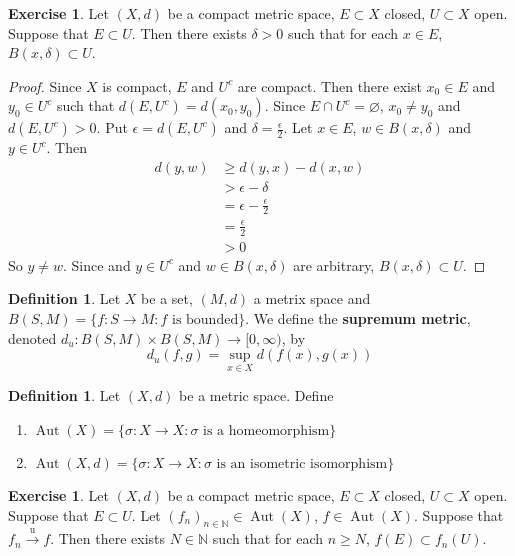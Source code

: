 \documentclass[12pt]{amsart}
\theoremstyle{definition}
\newtheorem{defn}[definition]{Definition}
\newtheorem{ex}[definition]{Exercise}
\newcommand{\del}{\delta}
\newcommand{\ep}{\epsilon}
\newcommand{\sig}{\sigma}
\newcommand{\N}{\mathbb{N}}
\newcommand{\Rg}{[0,\infty)}
\newcommand{\convt}[1]{\xrightarrow{\text{#1}}}
\DeclareMathOperator{\Aut}{Aut}
\begin{document}
	
	
	\begin{ex}
	Let $(X, d)$ be a compact metric space, $E \subset X$ closed, $U \subset X$ open. Suppose that $E \subset U$. Then there exists $\del >0$ such that for each $x \in E$, $B(x, \del) \subset U$.
	\end{ex}	
	
	\begin{proof}
	Since $X$ is compact, $E$ and $U^c$ are compact. Then there exist $x_0 \in E$ and $y_0 \in U^c$ such that $d(E, U^c) = d(x_0,y_0)$. Since $E \cap U^c = \varnothing$, $x_0 \neq y_0$ and $d(E, U^c) >0$. Put $\ep = d(E, U^c)$ and $\del = \frac{\ep}{2}$.  Let $x \in E$, $w \in B(x, \del)$ and $y \in U^c$. Then 
	\begin{align*}
	d(y, w) 
	&\geq d(y, x) - d(x, w) \\
	&> \ep - \del \\
	&= \ep - \frac{\ep}{2} \\
	&= \frac{\ep}{2} \\
	&> 0
\end{align*}	  
	So $y \neq w$. Since and $y \in U^c$ and $w \in B(x, \del)$ are arbitrary, $B(x, \del) \subset U$.
	\end{proof}
	
	\begin{defn}
	Let $X$ be a set, $(M, d)$ a metrix space and $B(S, M) = \{f: S \rightarrow M: f \text{ is bounded} \}$. We define the \textbf{supremum metric}, denoted $d_u:B(S,M) \times B(S,M) \rightarrow \Rg$, by $$d_u(f, g) = \sup_{x \in X}d(f(x), g(x)) $$ 
	\end{defn}
	
	\begin{defn}
	Let $(X, d)$ be a metric space. Define
	\begin{enumerate}
	\item $\Aut(X) = \{\sig:X \rightarrow X: \sig \text{ is a homeomorphism}\}$
	\item $\Aut(X, d) = \{\sig:X \rightarrow X: \sig \text{ is an isometric isomorphism}\}$
	\end{enumerate}
	\end{defn}
	
	\begin{ex}
	Let $(X, d)$ be a compact metric space, $E \subset X$ closed, $U \subset X$ open. Suppose that $E \subset U$. Let $(f_n)_{n \in \N} \in \Aut(X)$, $f \in \Aut(X)$.  Suppose that $f_n \convt{u} f$. Then there exists $N \in \N$ such that for each $n \geq N$, $f(E) \subset f_n(U)$.
	\end{ex}
	
\end{document}
